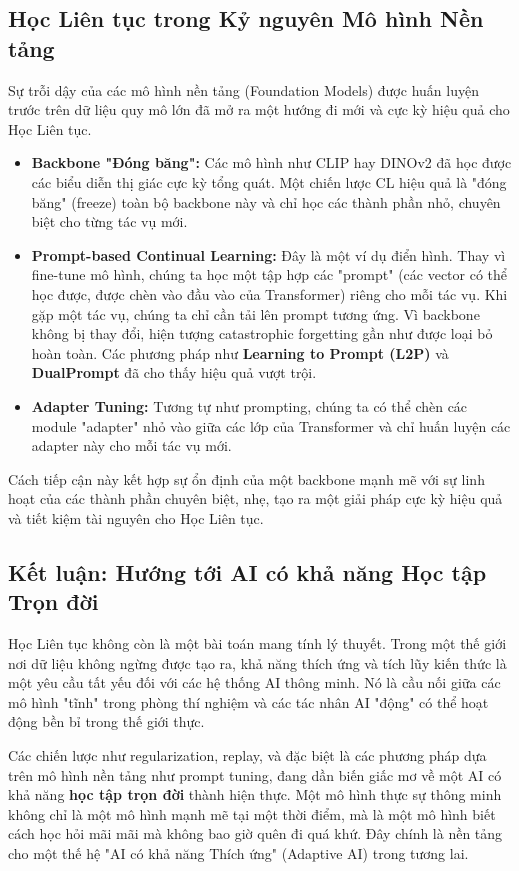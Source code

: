 \subsection{Học Liên tục trong Kỷ nguyên Mô hình Nền tảng}
\label{subsec:cl_foundation_models}
Sự trỗi dậy của các mô hình nền tảng (Foundation Models) được huấn luyện trước trên dữ liệu quy mô lớn đã mở ra một hướng đi mới và cực kỳ hiệu quả cho Học Liên tục.
\begin{itemize}
	\item \textbf{Backbone "Đóng băng":} Các mô hình như CLIP hay DINOv2 đã học được các biểu diễn thị giác cực kỳ tổng quát. Một chiến lược CL hiệu quả là "đóng băng" (freeze) toàn bộ backbone này và chỉ học các thành phần nhỏ, chuyên biệt cho từng tác vụ mới.
	\item \textbf{Prompt-based Continual Learning:} \cite{Wang2022_L2P} Đây là một ví dụ điển hình. Thay vì fine-tune mô hình, chúng ta học một tập hợp các "prompt" (các vector có thể học được, được chèn vào đầu vào của Transformer) riêng cho mỗi tác vụ. Khi gặp một tác vụ, chúng ta chỉ cần tải lên prompt tương ứng. Vì backbone không bị thay đổi, hiện tượng catastrophic forgetting gần như được loại bỏ hoàn toàn. Các phương pháp như \textbf{Learning to Prompt (L2P)} và \textbf{DualPrompt} đã cho thấy hiệu quả vượt trội.
	\item \textbf{Adapter Tuning:} Tương tự như prompting, chúng ta có thể chèn các module "adapter" nhỏ vào giữa các lớp của Transformer và chỉ huấn luyện các adapter này cho mỗi tác vụ mới.
\end{itemize}
Cách tiếp cận này kết hợp sự ổn định của một backbone mạnh mẽ với sự linh hoạt của các thành phần chuyên biệt, nhẹ, tạo ra một giải pháp cực kỳ hiệu quả và tiết kiệm tài nguyên cho Học Liên tục.

\subsection{Kết luận: Hướng tới AI có khả năng Học tập Trọn đời}
\label{subsec:cl_conclusion}
Học Liên tục không còn là một bài toán mang tính lý thuyết. Trong một thế giới nơi dữ liệu không ngừng được tạo ra, khả năng thích ứng và tích lũy kiến thức là một yêu cầu tất yếu đối với các hệ thống AI thông minh. Nó là cầu nối giữa các mô hình "tĩnh" trong phòng thí nghiệm và các tác nhân AI "động" có thể hoạt động bền bỉ trong thế giới thực.

Các chiến lược như regularization, replay, và đặc biệt là các phương pháp dựa trên mô hình nền tảng như prompt tuning, đang dần biến giấc mơ về một AI có khả năng \textbf{học tập trọn đời} thành hiện thực. Một mô hình thực sự thông minh không chỉ là một mô hình mạnh mẽ tại một thời điểm, mà là một mô hình biết cách học hỏi mãi mãi mà không bao giờ quên đi quá khứ. Đây chính là nền tảng cho một thế hệ "AI có khả năng Thích ứng" (Adaptive AI) trong tương lai.

